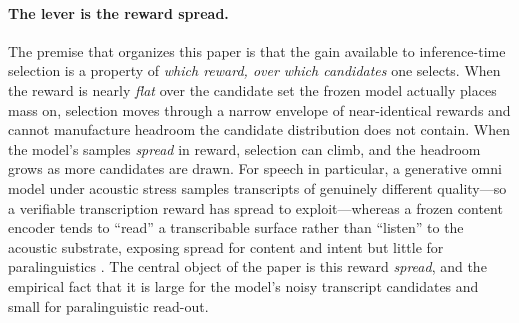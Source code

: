 \paragraph{The lever is the reward spread.}
The premise that organizes this paper is that the gain available to inference-time selection is a property of \emph{which reward, over which candidates} one selects. When the reward is nearly \emph{flat} over the candidate set the frozen model actually places mass on, selection moves through a narrow envelope of near-identical rewards and cannot manufacture headroom the candidate distribution does not contain. When the model's samples \emph{spread} in reward, selection can climb, and the headroom grows as more candidates are drawn. For speech in particular, a generative omni model under acoustic stress samples transcripts of genuinely different quality---so a verifiable transcription reward has spread to exploit---whereas a frozen content encoder tends to ``read'' a transcribable surface rather than ``listen'' to the acoustic substrate, exposing spread for content and intent but little for paralinguistics \citep{min2022rethinking,voxparadox2026,hsu2023iclspeech}. The central object of the paper is this reward \emph{spread}, and the empirical fact that it is large for the model's noisy transcript candidates and small for paralinguistic read-out.


